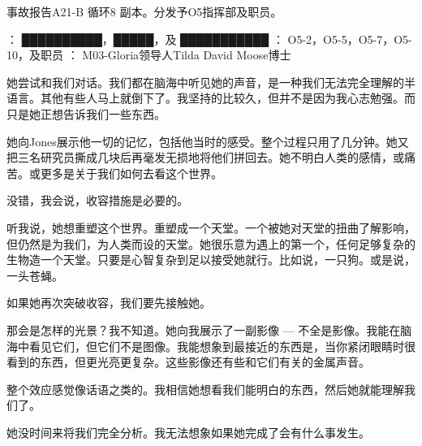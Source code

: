 \begin{scpbox}
事故报告A21-B 循环8 副本。分发予O5指挥部及职员。

： ██████████，█████，及 ███████████
： O5-2，O5-5，O5-7，O5-10，及职员
： M03-Gloria领导人Tilda David Moose博士


她尝试和我们对话。我们都在脑海中听见她的声音，是一种我们无法完全理解的半语言。其他有些人马上就倒下了。我坚持的比较久，但并不是因为我心志勉强。而只是她正想告诉我们一些东西。

她向Jones展示他一切的记忆，包括他当时的感受。整个过程只用了几分钟。她又把三名研究员撕成几块后再毫发无损地将他们拼回去。她不明白人类的感情，或痛苦。或更多是关于我们如何去看这个世界。

没错，我会说，收容措施是必要的。

听我说，她想重塑这个世界。重塑成一个天堂。一个被她对天堂的扭曲了解影响，但仍然是为我们，为人类而设的天堂。她很乐意为遇上的第一个，任何足够复杂的生物造一个天堂。只要是心智复杂到足以接受她就行。比如说，一只狗。或是说，一头苍蝇。

如果她再次突破收容，我们要先接触她。

那会是怎样的光景？我不知道。她向我展示了一副影像 — 不全是影像。我能在脑海中看见它们，但它们不是图像。我能想象到最接近的东西是，当你紧闭眼睛时很看到的东西，但更光亮更复杂。这些影像还有些和它们有关的金属声音。

整个效应感觉像话语之类的。我相信她想看我们能明白的东西，然后她就能理解我们了。

她没时间来将我们完全分析。我无法想象如果她完成了会有什么事发生。
\end{scpbox}

\hr\\